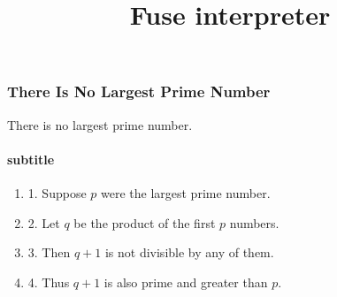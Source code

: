 \documentclass{beamer}
\title{Fuse interpreter}
\begin{document}
\begin{frame}
	\frametitle{There Is No Largest Prime Number}
	There is no largest prime number.
	\framesubtitle{subtitle}
	\begin{enumerate}
		\item 1. Suppose $p$ were the largest prime number.
		\item 2. Let $q$ be the product of the first $p$ numbers.
		\item 3. Then $q+1$ is not divisible by any of them.
		\item 4. Thus $q+1$ is also prime and greater than $p$.\qedhere
	\end{enumerate}
\end{frame}
\end{document}
